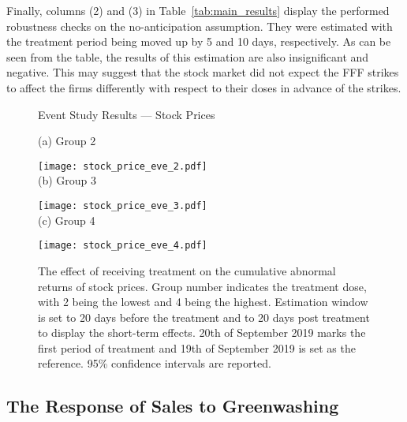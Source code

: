 \documentclass[12pt]{article}
\begin{document}
Finally, columns (2) and (3) in Table~\ref{tab:main_results} display the performed robustness checks on the no-anticipation assumption. They were estimated with the treatment period being moved up by 5 and 10 days, respectively. As can be seen from the table, the results of this estimation are also insignificant and negative. This may suggest that the stock market did not expect the FFF strikes to affect the firms differently with respect to their doses in advance of the strikes. 


\begin{figure}
    \caption{Event Study Results --- Stock Prices}\label{fig:eve_stock}
    \centering
    
    (a) Group 2
    
    \texttt{[image: stock\_price\_eve\_2.pdf]} \\
    
    (b) Group 3
    
    \texttt{[image: stock\_price\_eve\_3.pdf]} \\
    
    (c) Group 4
    
    \texttt{[image: stock\_price\_eve\_4.pdf]}
    
    \captionsetup{font=footnotesize}
    \caption*{The effect of receiving treatment on the cumulative abnormal returns of stock prices. Group number indicates the treatment dose, with 2 being the lowest and 4 being the highest. Estimation window is set to 20 days before the treatment and to 20 days post treatment to display the short-term effects. 20th of September 2019 marks the first period of treatment and 19th of September 2019 is set as the reference. 95\% confidence intervals are reported.}
\end{figure}



\subsection{The Response of Sales to Greenwashing}
\end{document}

